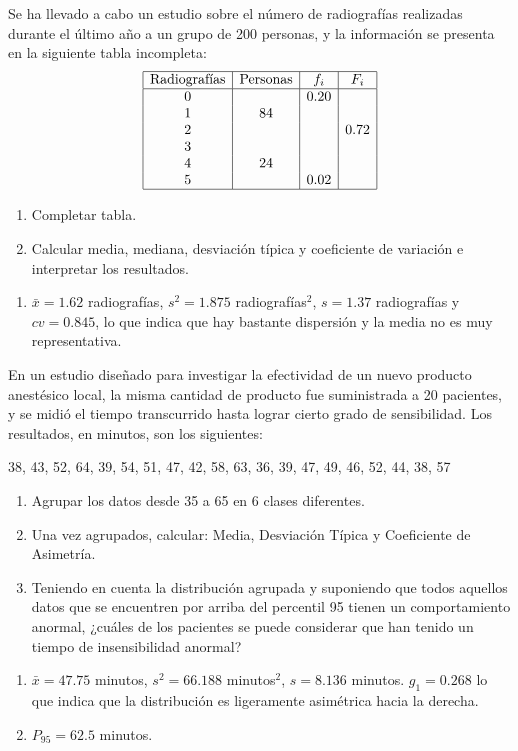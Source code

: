{Se ha llevado a cabo un estudio sobre el número de radiografías realizadas durante el último año a un grupo de 200 personas, y la información se presenta en la siguiente tabla incompleta:
\[
\begin{array}{|c|c|c|c|}
\hline
\mbox{Radiografías} & \mbox{Personas} & f_i & F_i \\
\hline
0 &    & 0.20 &      \\
1 & 84 &      &      \\
2 &    &      & 0.72 \\
3 &    &      &      \\
4 & 24 &      &      \\
5 &    & 0.02 &      \\  
\hline
\end{array}
\]
\begin{enumerate}
\item Completar tabla.
\item Calcular media, mediana, desviación típica y coeficiente de variación e interpretar los resultados.
\end{enumerate}
}
{\begin{enumerate}[start=2]
\item $\bar x= 1.62$ radiografías, $s^2=1.875$ radiografías$^2$, $s=1.37$ radiografías y $cv=0.845$, lo que indica que hay bastante dispersión y la media no es muy representativa.
\end{enumerate}
}
{}


{En un estudio diseñado para investigar la efectividad de un nuevo producto anestésico local, la misma cantidad de producto fue suministrada a 20 pacientes, y se midió el tiempo transcurrido hasta lograr cierto grado de sensibilidad. Los resultados, en minutos, son los siguientes:
\begin{center}
38, 43, 52, 64, 39, 54, 51, 47, 42, 58, 63, 36, 39, 47, 49, 46, 52, 44, 38, 57
\end{center}
\begin{enumerate}
\item Agrupar los datos desde 35 a 65 en 6 clases diferentes.
\item Una vez agrupados, calcular: Media, Desviación Típica y Coeficiente de Asimetría.
\item Teniendo en cuenta la distribución agrupada y suponiendo que todos aquellos datos que se encuentren por arriba del percentil 95 tienen un comportamiento anormal, ¿cuáles de los pacientes se puede considerar que han tenido un tiempo de insensibilidad anormal?
\end{enumerate}
}
{\begin{enumerate}[start=2]
\item $\bar x= 47.75$ minutos, $s^2=66.188$ minutos$^2$, $s=8.136$ minutos. $g_1=0.268$ lo que indica que la distribución es ligeramente asimétrica hacia la derecha.
\item $P_{95}=62.5$ minutos. 
\end{enumerate}
}
{}


